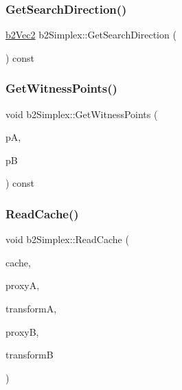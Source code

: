 \mbox{\label{structb2_simplex_af29facd0f4138b32929b575e74ecabd9}} 
\subsubsection{\texorpdfstring{GetSearchDirection()}{GetSearchDirection()}}
{\footnotesize\ttfamily \mbox{\hyperlink{structb2_vec2}{b2\+Vec2}} b2\+Simplex\+::\+Get\+Search\+Direction (\begin{DoxyParamCaption}{ }\end{DoxyParamCaption}) const\hspace{0.3cm}{\ttfamily [inline]}}

\mbox{\label{structb2_simplex_ac0ce6596bc03509851efb79e8824c1cd}} 
\subsubsection{\texorpdfstring{GetWitnessPoints()}{GetWitnessPoints()}}
{\footnotesize\ttfamily void b2\+Simplex\+::\+Get\+Witness\+Points (\begin{DoxyParamCaption}\item[{\mbox{\hyperlink{structb2_vec2}{b2\+Vec2}} $\ast$}]{pA,  }\item[{\mbox{\hyperlink{structb2_vec2}{b2\+Vec2}} $\ast$}]{pB }\end{DoxyParamCaption}) const\hspace{0.3cm}{\ttfamily [inline]}}

\mbox{\label{structb2_simplex_ada29ffb34774589d2e4686316104ddbc}} 
\subsubsection{\texorpdfstring{ReadCache()}{ReadCache()}}
{\footnotesize\ttfamily void b2\+Simplex\+::\+Read\+Cache (\begin{DoxyParamCaption}\item[{const \mbox{\hyperlink{structb2_simplex_cache}{b2\+Simplex\+Cache}} $\ast$}]{cache,  }\item[{const \mbox{\hyperlink{structb2_distance_proxy}{b2\+Distance\+Proxy}} $\ast$}]{proxyA,  }\item[{const \mbox{\hyperlink{structb2_transform}{b2\+Transform}} \&}]{transformA,  }\item[{const \mbox{\hyperlink{structb2_distance_proxy}{b2\+Distance\+Proxy}} $\ast$}]{proxyB,  }\item[{const \mbox{\hyperlink{structb2_transform}{b2\+Transform}} \&}]{transformB }\end{DoxyParamCaption})\hspace{0.3cm}{\ttfamily [inline]}}

